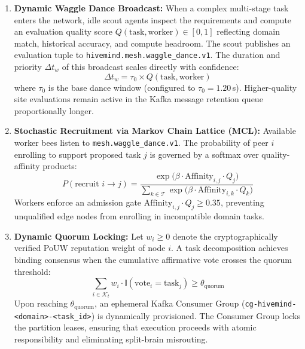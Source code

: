 \documentclass[11pt,a4paper]{article}
\begin{document}
\begin{enumerate}[leftmargin=1.8em]
    \item \textbf{Dynamic Waggle Dance Broadcast:} When a complex multi-stage task enters the network, idle scout agents inspect the requirements and compute an evaluation quality score $Q(\text{task}, \text{worker}) \in [0, 1]$ reflecting domain match, historical accuracy, and compute headroom. The scout publishes an evaluation tuple to \texttt{hivemind.mesh.waggle\_dance.v1}. The duration and priority $\Delta t_w$ of this broadcast scales directly with confidence:
    \begin{equation}
        \Delta t_w = \tau_0 \times Q(\text{task}, \text{worker})
        \label{eq:waggle_duration}
    \end{equation}
    where $\tau_0$ is the base dance window (configured to $\tau_0 = 1.20$\,s). Higher-quality site evaluations remain active in the Kafka message retention queue proportionally longer.

    \item \textbf{Stochastic Recruitment via Markov Chain Lattice (MCL):} Available worker bees listen to \texttt{mesh.waggle\_dance.v1}. The probability of peer $i$ enrolling to support proposed task $j$ is governed by a softmax over quality-affinity products:
    \begin{equation}
        P(\text{recruit } i \to j) = \frac{\exp\bigl(\beta \cdot \text{Affinity}_{i,j} \cdot Q_j\bigr)}{\sum_{k \in \mathcal{T}} \exp\bigl(\beta \cdot \text{Affinity}_{i,k} \cdot Q_k\bigr)}
        \label{eq:mcl_recruitment}
    \end{equation}
    Workers enforce an admission gate $\text{Affinity}_{i,j} \cdot Q_j \ge 0.35$, preventing unqualified edge nodes from enrolling in incompatible domain tasks.

    \item \textbf{Dynamic Quorum Locking:} Let $w_i \ge 0$ denote the cryptographically verified PoUW reputation weight of node $i$. A task decomposition achieves binding consensus when the cumulative affirmative vote crosses the quorum threshold:
    \begin{equation}
        \sum_{i \in \mathcal{K}_t} w_i \cdot \mathbb{I}(\text{vote}_i = \text{task}_j) \ge \theta_{\text{quorum}}
        \label{eq:quorum_condition}
    \end{equation}
    Upon reaching $\theta_{\text{quorum}}$, an ephemeral Kafka Consumer Group (\texttt{cg-hivemind-<domain>-<task\_id>}) is dynamically provisioned. The Consumer Group locks the partition leases, ensuring that execution proceeds with atomic responsibility and eliminating split-brain misrouting.
\end{enumerate}
\end{document}

